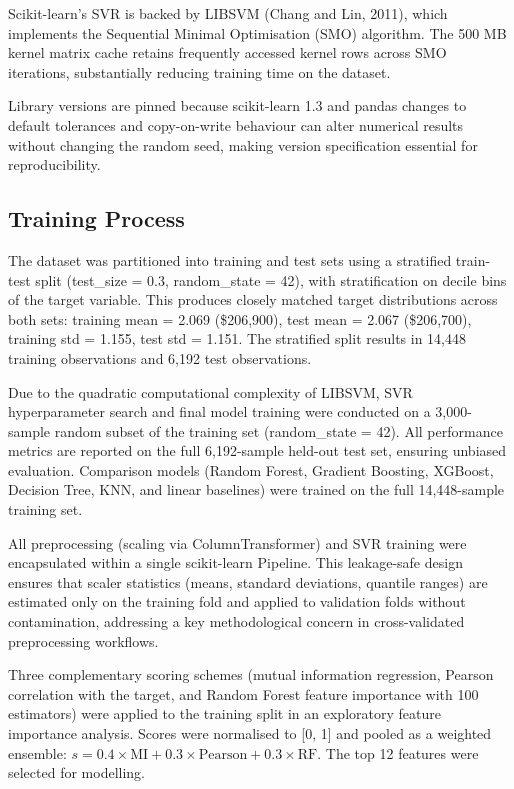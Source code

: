 \documentclass[pdflatex,sn-mathphys-num]{sn-jnl}
\begin{document}
Scikit-learn's SVR is backed by LIBSVM (Chang and Lin, 2011), which implements the Sequential Minimal Optimisation (SMO) algorithm. The 500 MB kernel matrix cache retains frequently accessed kernel rows across SMO iterations, substantially reducing training time on the dataset.

Library versions are pinned because scikit-learn 1.3 and pandas changes to default tolerances and copy-on-write behaviour can alter numerical results without changing the random seed, making version specification essential for reproducibility.

\subsection{Training Process}
The dataset was partitioned into training and test sets using a stratified train-test split (test\_size = 0.3, random\_state = 42), with stratification on decile bins of the target variable. This produces closely matched target distributions across both sets: training mean = 2.069 (\$206,900), test mean = 2.067 (\$206,700), training std = 1.155, test std = 1.151. The stratified split results in 14,448 training observations and 6,192 test observations.

Due to the quadratic computational complexity of LIBSVM, SVR hyperparameter search and final model training were conducted on a 3,000-sample random subset of the training set (random\_state = 42). All performance metrics are reported on the full 6,192-sample held-out test set, ensuring unbiased evaluation. Comparison models (Random Forest, Gradient Boosting, XGBoost, Decision Tree, KNN, and linear baselines) were trained on the full 14,448-sample training set.

All preprocessing (scaling via ColumnTransformer) and SVR training were encapsulated within a single scikit-learn Pipeline. This leakage-safe design ensures that scaler statistics (means, standard deviations, quantile ranges) are estimated only on the training fold and applied to validation folds without contamination, addressing a key methodological concern in cross-validated preprocessing workflows.

Three complementary scoring schemes (mutual information regression, Pearson correlation with the target, and Random Forest feature importance with 100 estimators) were applied to the training split in an exploratory feature importance analysis. Scores were normalised to [0, 1] and pooled as a weighted ensemble: $s = 0.4 \times \text{MI} + 0.3 \times \text{Pearson} + 0.3 \times \text{RF}$. The top 12 features were selected for modelling.
\end{document}
